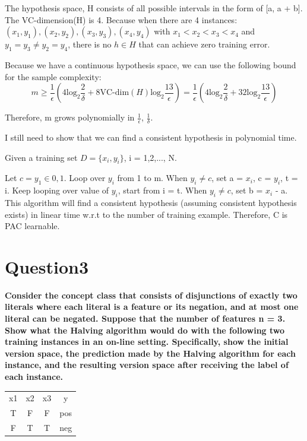 \documentclass[paper=a4, fontsize=11pt]{scrartcl} %
\numberwithin{equation}{section} %
\numberwithin{figure}{section} %
\numberwithin{table}{section} %
\begin{document}
The hypothesis space, H consists of all possible intervals in the form of [a, a + b]. The VC-dimension(H) is 4. Because when there are 4 instances: $(x_1,y_1),(x_2,y_2),(x_3,y_3),(x_4,y_4)$ with $x_1< x_2< x_3< x_4$ and $y_1 = y_3 \neq y_2 = y_4$, there is no $h \in H$ that can achieve zero training error. 

Because we have a continuous hypothesis space, we can use the following bound for the sample complexity: 
$$
m \geq \frac{1}{\epsilon} (4 \text{log}_2 \frac{2}{\delta} + 8 \text{VC-dim}(H) \text{log}_2 \frac{13}{\epsilon}) = \frac{1}{\epsilon} (4 \text{log}_2 \frac{2}{\delta} + 32 \text{log}_2 \frac{13}{\epsilon})
$$

Therefore, m grows polynomially in $\frac{1}{\epsilon}$, $\frac{1}{\delta}$. 

\bigbreak
I still need to show that we can find a consistent hypothesis in polynomial time. 

Given a training set $D = \{x_i,y_i\}$, i = 1,2,..., N. 

Let $c = y_1 \in {0,1}$. Loop over $y_i$ from 1 to m. When $y_i \neq c$, set a = $x_i$, c = $y_i$, t = i. Keep looping over value of $y_i$, start from i = t. When $y_i \neq c$, set b = $x_i$ - a. 
\bigbreak 
This algorithm will find a consistent hypothesis (assuming consistent hypothesis exists) in linear time w.r.t to the number of training example. Therefore, C is PAC learnable. 

\newpage
\section*{Question3}
\textbf{Consider the concept class that consists of disjunctions of exactly two literals where each literal is a feature or its negation, and at most one literal can be negated. Suppose that the number of features n = 3. Show what the Halving algorithm would do with the following two training instances in an on-line setting. Specifically, show the initial version space, the prediction made by the Halving algorithm for each instance, and the resulting version space after receiving the label of each instance.}

\begin{center}
\begin{tabular}{ c c c c}
 x1 & x2 & x3 & y \\ 
 T & F & F & pos \\  
 F & T & T & neg \\  
\end{tabular}
\end{center}
\end{document}
